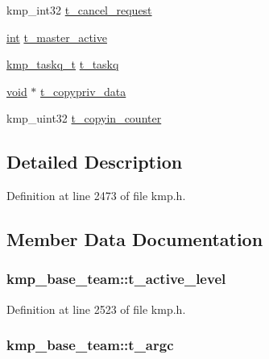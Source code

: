 \begin{DoxyCompactItemize}
\item 
kmp\-\_\-int32 \hyperlink{structkmp__base__team_a30ed1abd475e0ed6fd7d233322289680}{t\-\_\-cancel\-\_\-request}
\item 
\hyperlink{ittnotify__static_8h_a8b8dcd723308a8cb5d84277c7a3fff70}{int} \hyperlink{structkmp__base__team_a18340fbe86c61e660834d20385e6d40c}{t\-\_\-master\-\_\-active}
\item 
\hyperlink{kmp_8h_ae207b236f7a3d55695081785fc567eaf}{kmp\-\_\-taskq\-\_\-t} \hyperlink{structkmp__base__team_a29f00e7a761ee51520f34dd941bba0da}{t\-\_\-taskq}
\item 
\hyperlink{ittnotify__static_8h_af941d56e55e3c5465135b60c4d6343ed}{void} $\ast$ \hyperlink{structkmp__base__team_aa32227ecc52d1d8c3cb1ddd90ea5ae5e}{t\-\_\-copypriv\-\_\-data}
\item 
kmp\-\_\-uint32 \hyperlink{structkmp__base__team_a6d490508396814c7161cae6c4a58d4b0}{t\-\_\-copyin\-\_\-counter}
\end{DoxyCompactItemize}


\subsection{Detailed Description}


Definition at line 2473 of file kmp.\-h.



\subsection{Member Data Documentation}
\hypertarget{structkmp__base__team_afd66d880f95d74035a72c0c7fd6da643}{
\subsubsection[{t\-\_\-active\-\_\-level}]{ kmp\-\_\-base\-\_\-team\-::t\-\_\-active\-\_\-level}}\label{structkmp__base__team_afd66d880f95d74035a72c0c7fd6da643}


Definition at line 2523 of file kmp.\-h.

\hypertarget{structkmp__base__team_acb73515747b762604405fcbee3686477}{
\subsubsection[{t\-\_\-argc}]{ kmp\-\_\-base\-\_\-team\-::t\-\_\-argc}}\label{structkmp__base__team_acb73515747b762604405fcbee3686477}


